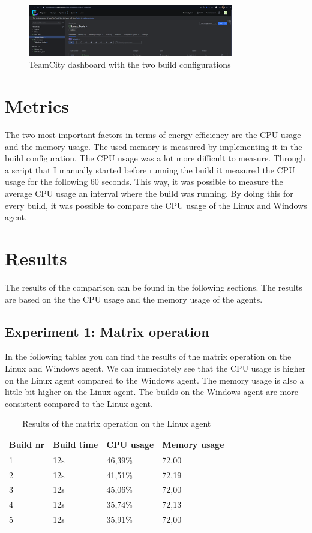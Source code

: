 \begin{figure}[H]
\centering
\includegraphics[width=0.8\textwidth]{graphics/TeamCity.png}
\caption{TeamCity dashboard with the two build configurations}
\end{figure}

\section{Metrics}
The two most important factors in terms of energy-efficiency are the CPU usage and the memory usage. The used memory is measured by implementing it in the build configuration. The CPU usage was a lot more difficult to measure. Through a script that I manually started before running the build it measured the CPU usage for the following 60 seconds. This way, it was possible to measure the average CPU usage an interval where the build was running. By doing this for every build, it was possible to compare the CPU usage of the Linux and Windows agent.

\section{Results}
The results of the comparison can be found in the following sections. The results are based on the the CPU usage and the memory usage of the agents.

\subsection{Experiment 1: Matrix operation}
In the following tables you can find the results of the matrix operation on the Linux and Windows agent. We can immediately see that the CPU usage is higher on the Linux agent compared to the Windows agent. The memory usage is also a little bit higher on the Linux agent. The builds on the Windows agent are more consistent compared to the Linux agent.
\begin{table}[H]
\centering
\begin{tabular}{|l|l|l|l|}
\hline
Build nr & Build time & CPU usage & Memory usage \\ \hline
1        & 12s        & 46,39\%   & 72,00       \\ \hline
2        & 12s        & 41,51\%   & 72,19       \\ \hline
3        & 12s        & 45,06\%   & 72,00       \\ \hline
4        & 12s        & 35,74\%   & 72,13       \\ \hline
5        & 12s        & 35,91\%   & 72,00       \\ \hline
\end{tabular}
\caption{Results of the matrix operation on the Linux agent}
\end{table}

